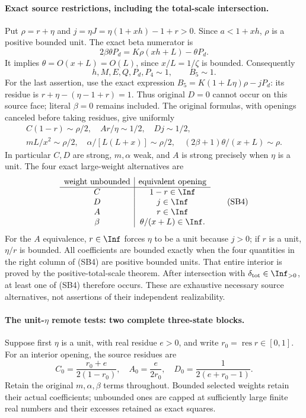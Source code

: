 \paragraph{Exact source restrictions, including the total-scale intersection.}
Put $\rho=r+\eta$ and $j=\eta J=\eta(1+xh)-1+r>0$.
Since $a<1+xh$, $\rho$ is a positive bounded unit. The exact beta
numerator is
\[
 2\beta\theta P_d=K\rho(xh+L)-\theta P_d.       \tag{SB1}
\]
It implies $\theta=O(x+L)=O(L)$, since $x/L=1/\zeta$ is bounded.
Consequently
\[
 h,M,E,Q,P_d,P_4\sim1,\qquad B_5\sim1.           \tag{SB2}
\]
For the last assertion, use the exact expression
$B_5=K(1+L\eta)\rho-jP_d$: its residue is
$r+\eta-(\eta-1+r)=1$. Thus original $D=0$ cannot occur on
this source face; literal $\beta=0$ remains included.
The original formulas, with openings canceled before taking residues,
give uniformly
\[
\begin{gathered}
 C(1-r)\sim\rho/2,\quad Ar/\eta\sim1/2,
 \quad Dj\sim1/2,\\
 mL/x^2\sim\rho/2,\quad
 \alpha/[L(L+x)]\sim\rho/2,\quad
 (2\beta+1)\theta/(x+L)\sim\rho.
\end{gathered}                                         \tag{SB3}
\]
In particular $C,D$ are strong, $m,\alpha$ weak, and $A$ is strong
precisely when $\eta$ is a unit. The four exact large-weight
alternatives are
\[
\begin{array}{c|c}
\text{weight unbounded}&\text{equivalent opening}\\\hline
C&1-r\in\Inf\\
D&j\in\Inf\\
A&r\in\Inf\\
\beta&\theta/(x+L)\in\Inf.
\end{array}                                                   \tag{SB4}
\]
For the $A$ equivalence, $r\in\Inf$ forces $\eta$ to be a unit
because $j>0$; if $r$ is a unit, $\eta/r$ is bounded.
All coefficients are bounded exactly when the four quantities in
the right column of (SB4) are positive bounded units. That entire
interior is proved by the positive-total-scale theorem.
After intersection with $\delta_{\rm tot}\in\Inf_{>0}$, at least
one of (SB4) therefore occurs. These are exhaustive necessary source
alternatives, not assertions of their independent realizability.

\paragraph{The unit-$\eta$ remote tests: two complete three-state blocks.}
Suppose first $\eta$ is a unit, with real residue $e>0$, and write
$r_0=\operatorname{res}r\in[0,1]$. For an interior opening,
the source residues are
\[
 C_0=\frac{r_0+e}{2(1-r_0)},\quad
 A_0=\frac e{2r_0},\quad D_0=\frac1{2(e+r_0-1)}.       \tag{SB5}
\]
Retain the original $m,\alpha,\beta$ terms throughout. Bounded
selected weights retain their actual coefficients; unbounded ones
are capped at sufficiently large finite real numbers and their
excesses retained as exact squares.

